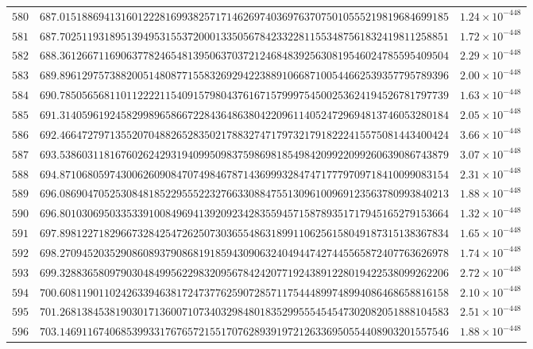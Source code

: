 \documentclass[12pt,reqno]{amsart}
\theoremstyle{remark}
\begin{document}
\begin{longtable}{clc}
$580$ & $687.0151886941316012228169938257171462697403697637075010555219819684699185$ & $1.24\times 10^{-448}$ \\
$581$ & $687.7025119318951394953155372000133505678423322811553487561832419811258851$ & $1.72\times 10^{-448}$ \\
$582$ & $688.3612667116906377824654813950637037212468483925630819546024785595409504$ & $2.29\times 10^{-448}$ \\
$583$ & $689.8961297573882005148087715583269294223889106687100544662539357795789396$ & $2.00\times 10^{-448}$ \\
$584$ & $690.7850565681101122221154091579804376167157999754500253624194526781797739$ & $1.63\times 10^{-448}$ \\
$585$ & $691.3140596192458299896586672284364863804220961140524729694813746053280184$ & $2.05\times 10^{-448}$ \\
$586$ & $692.4664727971355207048826528350217883274717973217918222415575081443400424$ & $3.66\times 10^{-448}$ \\
$587$ & $693.5386031181676026242931940995098375986981854984209922099260639086743879$ & $3.07\times 10^{-448}$ \\
$588$ & $694.8710680597430062609084707498467871436999328474717779709718410099083154$ & $2.31\times 10^{-448}$ \\
$589$ & $696.0869047052530848185229555223276633088475513096100969123563780993840213$ & $1.88\times 10^{-448}$ \\
$590$ & $696.8010306950335339100849694139209234283559457158789351717945165279153664$ & $1.32\times 10^{-448}$ \\
$591$ & $697.8981227182966732842547262507303655486318991106256158049187315138367834$ & $1.65\times 10^{-448}$ \\
$592$ & $698.2709452035290860893790868191859430906324049447427445565872407763626978$ & $1.74\times 10^{-448}$ \\
$593$ & $699.3288365809790304849956229832095678424207719243891228019422538099262206$ & $2.72\times 10^{-448}$ \\
$594$ & $700.6081190110242633946381724737762590728571175444899748994086468658816158$ & $2.10\times 10^{-448}$ \\
$595$ & $701.2681384538190301713600710734032984801835299555454547302082051888104583$ & $2.51\times 10^{-448}$ \\
$596$ & $703.1469116740685399331767657215517076289391972126336950554408903201557546$ & $1.88\times 10^{-448}$ \\

\end{longtable}
\end{document}
